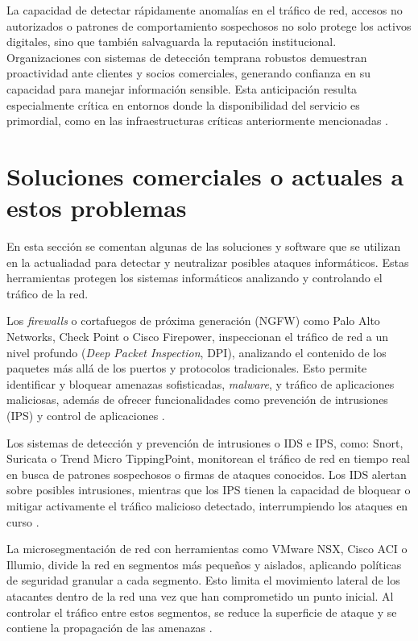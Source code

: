 La capacidad de detectar rápidamente anomalías en el tráfico de red, accesos no autorizados o patrones de comportamiento sospechosos no solo protege los activos digitales, sino que también salvaguarda la reputación institucional. Organizaciones con sistemas de detección temprana robustos demuestran proactividad ante clientes y socios comerciales, generando confianza en su capacidad para manejar información sensible. Esta anticipación resulta especialmente crítica en entornos donde la disponibilidad del servicio es primordial, como en las infraestructuras críticas anteriormente mencionadas \cite{Sommestad2019}.

\section{Soluciones comerciales o actuales a estos problemas}

En esta sección se comentan algunas de las soluciones y software que se utilizan en la actualiadad para detectar y neutralizar posibles ataques informáticos. Estas herramientas protegen los sistemas informáticos analizando y controlando el tráfico de la red.

Los \textit{firewalls} o cortafuegos de próxima generación (NGFW) como Palo Alto Networks, Check Point o Cisco Firepower, inspeccionan el tráfico de red a un nivel profundo (\textit{Deep Packet Inspection}, DPI), analizando el contenido de los paquetes más allá de los puertos y protocolos tradicionales. Esto permite identificar y bloquear amenazas sofisticadas, \textit{malware}, y tráfico de aplicaciones maliciosas, además de ofrecer funcionalidades como prevención de intrusiones (IPS) y control de aplicaciones \cite{cosmikal_firewall}.

Los sistemas de detección y prevención de intrusiones o IDS e IPS, como: Snort, Suricata o Trend Micro TippingPoint, monitorean el tráfico de red en tiempo real en busca de patrones sospechosos o firmas de ataques conocidos. Los IDS alertan sobre posibles intrusiones, mientras que los IPS tienen la capacidad de bloquear o mitigar activamente el tráfico malicioso detectado, interrumpiendo los ataques en curso \cite{geekflare_ids_ips}.

La microsegmentación de red con herramientas como VMware NSX, Cisco ACI o Illumio, divide la red en segmentos más pequeños y aislados, aplicando políticas de seguridad granular a cada segmento. Esto limita el movimiento lateral de los atacantes dentro de la red una vez que han comprometido un punto inicial. Al controlar el tráfico entre estos segmentos, se reduce la superficie de ataque y se contiene la propagación de las amenazas \cite{paloaltonetworks_microsegmentation}.


